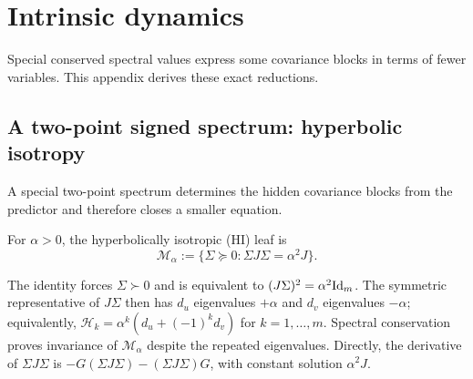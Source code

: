 \section{Intrinsic dynamics}\label{app:intrinsic}
Special conserved spectral values express some covariance blocks in terms
of fewer variables. This appendix derives these exact reductions.

\subsection{A two-point signed spectrum: hyperbolic isotropy}
A special two-point spectrum determines the hidden covariance blocks
from the predictor and therefore closes a smaller equation.
\begin{definition}\label{def:hyperbolic-isotropy}
For \(\alpha>0\), the hyperbolically isotropic (HI) leaf is
\begin{equation}\label{eq:intrinsic-hi}
 \mathcal M_\alpha:=\{\Sigma\succeq0:\Sigma J\Sigma=\alpha^2J\}.
\end{equation}
\end{definition}
The identity forces $\Sigma\succ0$ and is equivalent to
$(J\Sigma)^2=\alpha^2\mathrm{Id}_m$. The symmetric representative of $J\Sigma$
then has $d_u$ eigenvalues $+\alpha$ and $d_v$ eigenvalues $-\alpha$;
equivalently, $\mathcal H_k=\alpha^k(d_u+(-1)^kd_v)$ for $k=1,\ldots,m$.
Spectral conservation proves invariance of $\mathcal M_\alpha$ despite
the repeated eigenvalues. Directly, the derivative of $\Sigma J\Sigma$
is $-G(\Sigma J\Sigma)-(\Sigma J\Sigma)G$, with constant solution $\alpha^2J$.

